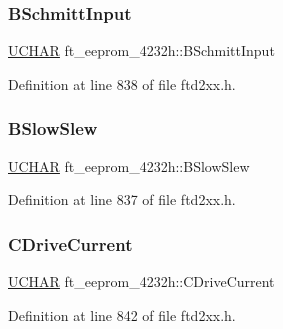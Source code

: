 \subsubsection{\texorpdfstring{B\+Schmitt\+Input}{BSchmittInput}}
{\footnotesize\ttfamily \hyperlink{CatCaloProto40MHz_2inc_2WinTypes_8h_a4f4bb67531a9bf6f0b9c6ad76aeba587}{U\+C\+H\+AR} ft\+\_\+eeprom\+\_\+4232h\+::\+B\+Schmitt\+Input}



Definition at line 838 of file ftd2xx.\+h.

\mbox{\label{structft__eeprom__4232h_acd3e611ccee7fc8be7c459e6a436efda}} 
\subsubsection{\texorpdfstring{B\+Slow\+Slew}{BSlowSlew}}
{\footnotesize\ttfamily \hyperlink{CatCaloProto40MHz_2inc_2WinTypes_8h_a4f4bb67531a9bf6f0b9c6ad76aeba587}{U\+C\+H\+AR} ft\+\_\+eeprom\+\_\+4232h\+::\+B\+Slow\+Slew}



Definition at line 837 of file ftd2xx.\+h.

\mbox{\label{structft__eeprom__4232h_a28fd0e83320d2b18d8e3494f019e8f4c}} 
\subsubsection{\texorpdfstring{C\+Drive\+Current}{CDriveCurrent}}
{\footnotesize\ttfamily \hyperlink{CatCaloProto40MHz_2inc_2WinTypes_8h_a4f4bb67531a9bf6f0b9c6ad76aeba587}{U\+C\+H\+AR} ft\+\_\+eeprom\+\_\+4232h\+::\+C\+Drive\+Current}



Definition at line 842 of file ftd2xx.\+h.

\mbox{\label{structft__eeprom__4232h_af1da86c7d0ff4bb811627c5d84c5ce79}} 
